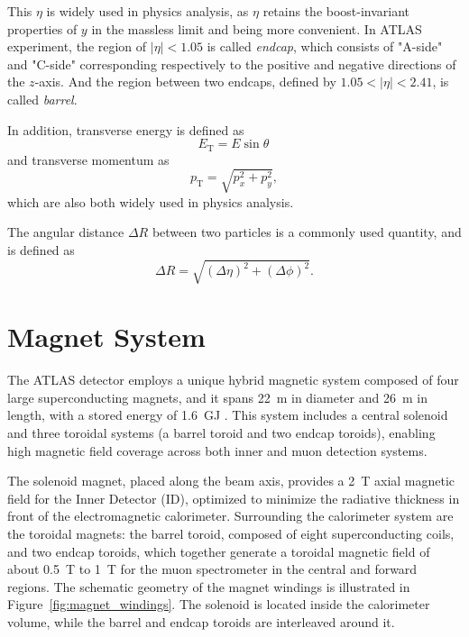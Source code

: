 This \(\eta\) is widely used in physics analysis, as \(\eta\) retains the boost-invariant properties of \(y\) in the massless limit and being more convenient. In ATLAS experiment, the region of $|\eta| < 1.05$ is called \textit{endcap}, which consists of "A-side" and "C-side" corresponding respectively to the positive and negative directions of the \(z\)-axis. And the region between two endcaps, defined by $1.05 < |\eta| < 2.41$, is called \textit{barrel}.

In addition, transverse energy is defined as 
\[
  E_{\mathrm{T}} = E \sin \theta\,
\]
and transverse momentum as
\[
  p_{\mathrm{T}} = \sqrt{p_x^2 + p_y^2},
\]
which are also both widely used in physics analysis.

The angular distance \(\Delta R\) between two particles is a commonly used quantity, and is defined as
\begin{equation}
  \Delta R = \sqrt{(\Delta \eta)^2 + (\Delta \phi)^2}.
  \label{eq:deltaR}
\end{equation}
\section{Magnet System} \label{sec:MagnetSystem}
The ATLAS detector employs a unique hybrid magnetic system composed of four large superconducting magnets, and it spans 22~m in diameter and 26~m in length, with a stored energy of 1.6~GJ \cite{ATLASDetector2008}. This system includes a central solenoid and three toroidal systems (a barrel toroid and two endcap toroids), enabling high magnetic field coverage across both inner and muon detection systems.

The solenoid magnet, placed along the beam axis, provides a 2~T axial magnetic field for the Inner Detector (ID), optimized to minimize the radiative thickness in front of the electromagnetic calorimeter. Surrounding the calorimeter system are the toroidal magnets: the barrel toroid, composed of eight superconducting coils, and two endcap toroids, which together generate a toroidal magnetic field of about 0.5~T to 1~T for the muon spectrometer in the central and forward regions. The schematic geometry of the magnet windings is illustrated in Figure~\ref{fig:magnet_windings}. The solenoid is located inside the calorimeter volume, while the barrel and endcap toroids are interleaved around it. 

